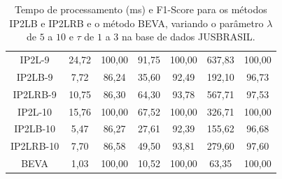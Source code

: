 \begin{table}[h]
{\begin{tabular}{c|cc|cc|cc|}
\multicolumn{1}{|c|}{IP2L-9} & 24,72 & 100,00 & 91,75 & 100,00 & 637,83 & 100,00 \\
\multicolumn{1}{|c|}{IP2LB-9} & 7,72 & 86,24 & 35,60 & 92,49 & 192,10 & 96,73 \\
\multicolumn{1}{|c|}{IP2LRB-9} & 10,75 & 86,30 & 64,30 & 93,78 & 567,71 & 97,53 \\ \hline
\multicolumn{1}{|c|}{IP2L-10} & 15,76 & 100,00 & 67,52 & 100,00 & 326,71 & 100,00 \\
\multicolumn{1}{|c|}{IP2LB-10} & 5,47 & 86,27 & 27,61 & 92,39 & 155,62 & 96,68 \\
\multicolumn{1}{|c|}{IP2LRB-10} & 7,70 & 86,58 & 49,50 & 93,81 & 279,60 & 97,60 \\ \hline
\multicolumn{1}{|c|}{BEVA} & 1,03 & 100,00 & 10,52 & 100,00 & 63,35 & 100,00 \\ \hline
\end{tabular}%
}
\caption{Tempo de processamento (ms) e F1-Score para os métodos IP2LB e IP2LRB e o método BEVA, variando o parâmetro $\lambda$ de $5$ a $10$ e $\tau$ de $1$ a $3$ na base de dados JUSBRASIL.}
\label{tab:f1-score-jusbrasil}
\end{table}

